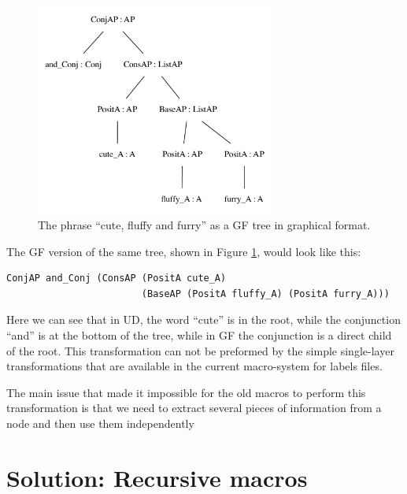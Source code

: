 \begin{figure}
    \centering
    \includegraphics[width=0.7\textwidth]{figure/cute_gf.png}
    \caption{The phrase ``cute, fluffy and furry'' as a GF tree in graphical format. }
    \label{fig:gf_cute}
\end{figure}

The GF version of the same tree, shown in Figure \ref{fig:gf_cute}, would look like this:

\begin{verbatim}
ConjAP and_Conj (ConsAP (PositA cute_A)
                        (BaseAP (PositA fluffy_A) (PositA furry_A)))
\end{verbatim}
Here we can see that in UD, the word ``cute'' is in the root, while the conjunction ``and'' is at the bottom of the tree, while in GF the conjunction is a direct child of the root. This transformation can not be preformed by the simple single-layer transformations that are available in the current macro-system for labels files.

The main issue that made it impossible for the old macros to perform this transformation is that we need to extract several pieces of information from a node and then use them independently 

\section{Solution: Recursive macros}

% 
% 
% 
% 

